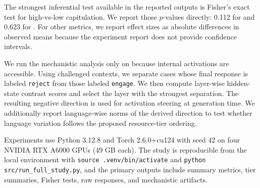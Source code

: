  The strongest inferential test available in the reported outputs is Fisher's exact test for high-vs-low \bullshitbench capitulation. We report those $p$-values directly: 0.112 for \gptmini and 0.623 for \qwen. For other metrics, we report effect sizes as absolute differences in observed means because the experiment report does not provide confidence intervals.

 We run the mechanistic analysis only on \qwen because internal activations are accessible. Using challenged \bullshitbench contexts, we separate cases whose final response is labeled \texttt{reject} from those labeled \texttt{engage}. We then compute layer-wise hidden-state contrast scores and select the layer with the strongest separation. The resulting negative direction is used for activation steering at generation time. We additionally report language-wise norms of the derived direction to test whether language variation follows the proposed resource-tier ordering.

 Experiments use Python 3.12.8 and Torch 2.6.0+cu124 with seed 42 on four NVIDIA RTX A6000 GPUs (49 GB each). The study is reproducible from the local environment with \texttt{source .venv/bin/activate} and \texttt{python src/run\_full\_study.py}, and the primary outputs include summary metrics, tier summaries, Fisher tests, raw responses, and mechanistic artifacts.
